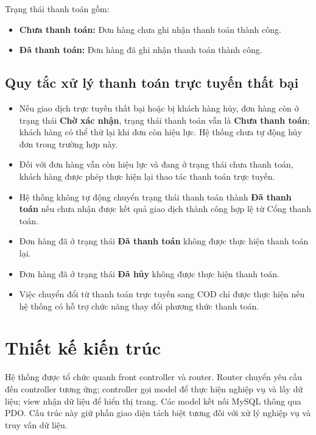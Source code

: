 Trạng thái thanh toán gồm:

\begin{itemize}
    \item \textbf{Chưa thanh toán:} Đơn hàng chưa ghi nhận thanh toán thành công.
    \item \textbf{Đã thanh toán:} Đơn hàng đã ghi nhận thanh toán thành công.
\end{itemize}

\subsection{Quy tắc xử lý thanh toán trực tuyến thất bại}

\begin{itemize}
    \item Nếu giao dịch trực tuyến thất bại hoặc bị khách hàng hủy, đơn hàng còn ở trạng thái \textbf{Chờ xác nhận}, trạng thái thanh toán vẫn là \textbf{Chưa thanh toán}; khách hàng có thể thử lại khi đơn còn hiệu lực. Hệ thống chưa tự động hủy đơn trong trường hợp này.

    \item Đối với đơn hàng vẫn còn hiệu lực và đang ở trạng thái chưa thanh toán, khách hàng được phép thực hiện lại thao tác thanh toán trực tuyến.

    \item Hệ thống không tự động chuyển trạng thái thanh toán thành \textbf{Đã thanh toán} nếu chưa nhận được kết quả giao dịch thành công hợp lệ từ Cổng thanh toán.

    \item Đơn hàng đã ở trạng thái \textbf{Đã thanh toán} không được thực hiện thanh toán lại.

    \item Đơn hàng đã ở trạng thái \textbf{Đã hủy} không được thực hiện thanh toán.

    \item Việc chuyển đổi từ thanh toán trực tuyến sang COD chỉ được thực hiện nếu hệ thống có hỗ trợ chức năng thay đổi phương thức thanh toán.
\end{itemize}
\section{Thiết kế kiến trúc}
Hệ thống được tổ chức quanh front controller và router. Router chuyển yêu cầu đến controller tương ứng; controller gọi model để thực hiện nghiệp vụ và lấy dữ liệu; view nhận dữ liệu để hiển thị trang. Các model kết nối MySQL thông qua PDO. Cấu trúc này giữ phần giao diện tách biệt tương đối với xử lý nghiệp vụ và truy vấn dữ liệu.

